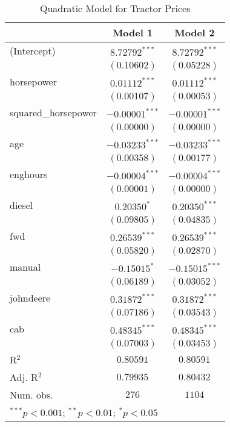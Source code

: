 
\begin{table}
\begin{center}
\begin{tabular}{l c c}
\hline
 & Model 1 & Model 2 \\
\hline
(Intercept)         & $8.72792^{***}$  & $8.72792^{***}$  \\
                    & $(0.10602)$      & $(0.05228)$      \\
horsepower          & $0.01112^{***}$  & $0.01112^{***}$  \\
                    & $(0.00107)$      & $(0.00053)$      \\
squared\_horsepower & $-0.00001^{***}$ & $-0.00001^{***}$ \\
                    & $(0.00000)$      & $(0.00000)$      \\
age                 & $-0.03233^{***}$ & $-0.03233^{***}$ \\
                    & $(0.00358)$      & $(0.00177)$      \\
enghours            & $-0.00004^{***}$ & $-0.00004^{***}$ \\
                    & $(0.00001)$      & $(0.00000)$      \\
diesel              & $0.20350^{*}$    & $0.20350^{***}$  \\
                    & $(0.09805)$      & $(0.04835)$      \\
fwd                 & $0.26539^{***}$  & $0.26539^{***}$  \\
                    & $(0.05820)$      & $(0.02870)$      \\
manual              & $-0.15015^{*}$   & $-0.15015^{***}$ \\
                    & $(0.06189)$      & $(0.03052)$      \\
johndeere           & $0.31872^{***}$  & $0.31872^{***}$  \\
                    & $(0.07186)$      & $(0.03543)$      \\
cab                 & $0.48345^{***}$  & $0.48345^{***}$  \\
                    & $(0.07003)$      & $(0.03453)$      \\
\hline
R$^2$               & $0.80591$        & $0.80591$        \\
Adj. R$^2$          & $0.79935$        & $0.80432$        \\
Num. obs.           & $276$            & $1104$           \\
\hline
\multicolumn{3}{l}{\scriptsize{$^{***}p<0.001$; $^{**}p<0.01$; $^{*}p<0.05$}}
\end{tabular}
\caption{Quadratic Model for Tractor Prices}
\label{tab:reg_sq_horse}
\end{center}
\end{table}
